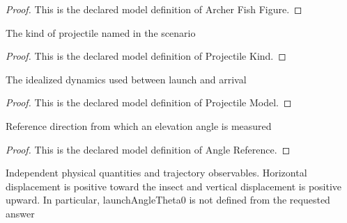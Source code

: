 \begin{proof}
  This is the declared model definition of Archer Fish Figure.
\end{proof}
\begin{definition}
  \label{def:physics:phyx-mini-0742:phyxminiproblems-problemphyxmini0742-projectilekind}
  The kind of projectile named in the scenario
\end{definition}
\begin{proof}
  This is the declared model definition of Projectile Kind.
\end{proof}
\begin{definition}
  \label{def:physics:phyx-mini-0742:phyxminiproblems-problemphyxmini0742-projectilemodel}
  The idealized dynamics used between launch and arrival
\end{definition}
\begin{proof}
  This is the declared model definition of Projectile Model.
\end{proof}
\begin{definition}
  \label{def:physics:phyx-mini-0742:phyxminiproblems-problemphyxmini0742-anglereference}
  Reference direction from which an elevation angle is measured
\end{definition}
\begin{proof}
  This is the declared model definition of Angle Reference.
\end{proof}
\begin{definition}
  \label{def:physics:phyx-mini-0742:phyxminiproblems-problemphyxmini0742-archerfishdropsetup}
  Independent physical quantities and trajectory observables. Horizontal displacement is positive toward the insect and vertical displacement is positive upward. In particular, launchAngleTheta0 is not defined from the requested answer
\end{definition}
